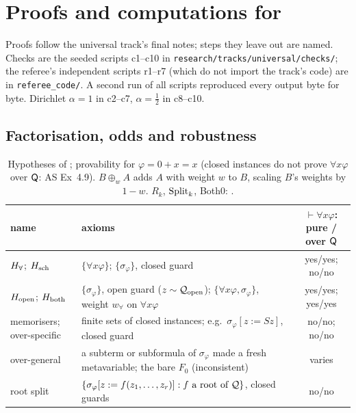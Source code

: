 
\section{Proofs and computations for \texorpdfstring{}{Section 3}}\label{app:univ}

Proofs follow the universal track's final notes; steps they leave out are named. Checks are the seeded scripts c1--c10 in \texttt{research/tracks/universal/checks/}; the referee's independent scripts r1--r7 (which do not import the track's code) are in \texttt{referee\_code/}. A second run of all scripts reproduced every output byte for byte. Dirichlet $\alpha=1$ in c2--c7, $\alpha=\tfrac12$ in c8--c10.

\subsection{Factorisation, odds and robustness}\label{app:univ:odds}

\begin{table}[ht]
\centering\footnotesize
\begin{tabularx}{\textwidth}{@{}l>{\raggedright\arraybackslash}X c@{}}
\toprule
name & axioms & $\vdash\forall x\varphi$: pure / over $\mathsf{Q}$\\
\midrule
$H_{\forall}$; $H_{\mathrm{sch}}$ & $\{\forall x\varphi\}$; $\{\sigma_\varphi\}$, closed guard & yes/yes; no/no\\
$H_{\mathrm{open}}$; $H_{\mathrm{both}}$ & $\{\sigma_\varphi\}$, open guard ($z\sim\mathcal{Q}_{\mathrm{open}}$); $\{\forall x\varphi,\sigma_\varphi\}$, weight $w_\forall$ on $\forall x\varphi$ & yes/yes; yes/yes\\
memorisers; over-specific & finite sets of closed instances; e.g.\ $\sigma_\varphi[z:=Sz]$, closed guard & no/no; no/no\\
over-general & a subterm or subformula of $\sigma_\varphi$ made a fresh metavariable; the bare $F_0$ (inconsistent) & varies\\
root split & $\{\sigma_\varphi[z:=f(z_1,\dots,z_r)]:f\text{ a root of }\mathcal{Q}\}$, closed guards & no/no\\
\bottomrule
\end{tabularx}
\caption{Hypotheses of ; provability for $\varphi=0+x=x$ (closed instances do not prove $\forall x\varphi$ over $\mathsf{Q}$: AS Ex~4.9). $B\oplus_wA$ adds $A$ with weight $w$ to $B$, scaling $B$'s weights by $1-w$. $R_k$, $\mathrm{Split}_k$, Both0: .}
\label{tab:univ:hyp}
\end{table}

